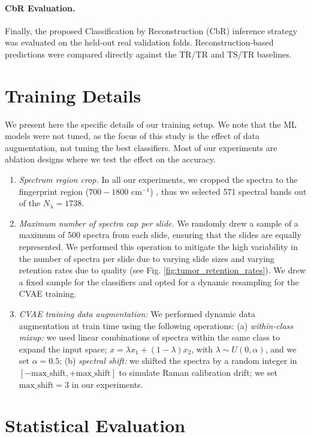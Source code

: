 \paragraph{CbR Evaluation.}
Finally, the proposed Classification by Reconstruction (CbR) inference strategy was evaluated on the held-out real validation folds. Reconstruction-based predictions were compared directly against the TR/TR and TS/TR baselines.

\section{Training Details}
We present here the specific details of our training setup. We note that the ML models were not tuned, as the focus of this study is the effect of data augmentation, not tuning the best classifiers. Most of our experiments are ablation designs where we test the effect on the accuracy.
\begin{enumerate}
    \item \textit{Spectrum region crop.} In all our experiments, we cropped the spectra to the fingerprint region ($700 - 1800 \text{ cm}^{-1}$) \cite{Harris2023}, thus we selected 571 spectral bands out of the $N_\lambda = 1738$. 
    \item \textit{Maximum number of spectra cap per slide.} We randomly drew a sample of a maximum of 500 spectra from each slide, ensuring that the slides are equally represented. We performed this operation to mitigate the high variability in the number of spectra per slide due to varying slide sizes and varying retention rates due to quality (see Fig. \ref{fig:tumor_retention_rates}). We drew a fixed sample for the classifiers and opted for a dynamic resampling for the CVAE training.
    \item \textit{CVAE training data augmentation:} We performed dynamic data augmentation at train time using the following operations: 
    (a) \textit{within-class mixup:} we used linear combinations of spectra within the same class to expand the input space; $x = \lambda x_1 + (1-\lambda) x_2$, with $\lambda \sim U(0,\alpha)$, and we set $\alpha = 0.5$; 
    (b) \textit{spectral shift:} we shifted the spectra by a random integer in $[-\text{max\_shift},+\text{max\_shift}]$ to simulate Raman calibration drift; we set $\text{max\_shift}=3$ in our experiments.
\end{enumerate}


\section{Statistical Evaluation}
\label{sec:statistical_eval}

